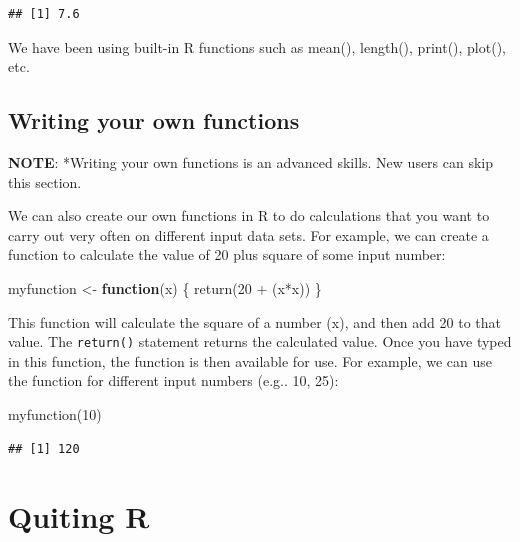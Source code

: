 \documentclass[
]{book}
\newenvironment{Shaded}{\begin{snugshade}}{\end{snugshade}}
\newcommand{\ControlFlowTok}[1]{\textcolor[rgb]{0.13,0.29,0.53}{\textbf{#1}}}
\newcommand{\DecValTok}[1]{\textcolor[rgb]{0.00,0.00,0.81}{#1}}
\newcommand{\FunctionTok}[1]{\textcolor[rgb]{0.00,0.00,0.00}{#1}}
\newcommand{\NormalTok}[1]{#1}
\newcommand{\OtherTok}[1]{\textcolor[rgb]{0.56,0.35,0.01}{#1}}
\newcommand{\SpecialCharTok}[1]{\textcolor[rgb]{0.00,0.00,0.00}{#1}}
\begin{document}
\begin{verbatim}
## [1] 7.6
\end{verbatim}

We have been using built-in R functions such as mean(), length(), print(), plot(), etc.

\hypertarget{writing-your-own-functions}{%
\subsection{Writing your own functions}\label{writing-your-own-functions}}

\textbf{NOTE}: *Writing your own functions is an advanced skills. New users can skip this section.

We can also create our own functions in R to do calculations that you want to carry out very often on different input data sets. For example, we can create a function to calculate the value of 20 plus square of some input number:

\begin{Shaded}
\begin{Highlighting}[]
\NormalTok{myfunction }\OtherTok{\textless{}{-}} \ControlFlowTok{function}\NormalTok{(x) \{ }\FunctionTok{return}\NormalTok{(}\DecValTok{20} \SpecialCharTok{+}\NormalTok{ (x}\SpecialCharTok{*}\NormalTok{x)) \}}
\end{Highlighting}
\end{Shaded}

This function will calculate the square of a number (x), and then add 20 to that value. The \texttt{return()} statement returns the calculated value. Once you have typed in this function, the function is then available for use. For example, we can use the function for different input numbers (e.g.. 10, 25):

\begin{Shaded}
\begin{Highlighting}[]
\FunctionTok{myfunction}\NormalTok{(}\DecValTok{10}\NormalTok{)}
\end{Highlighting}
\end{Shaded}

\begin{verbatim}
## [1] 120
\end{verbatim}

\hypertarget{quiting-r}{%
\section{Quiting R}\label{quiting-r}}
\end{document}
